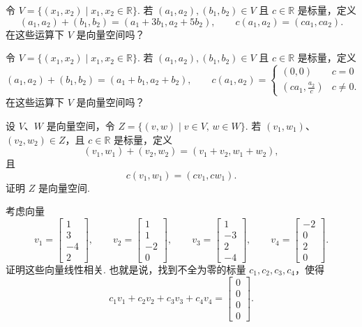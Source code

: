 \begin{question}\label{q:1-20}
令 $V=\{(x_1,x_2)\mid x_1,x_2\in\mathbb{R}\}$. 若 $(a_1,a_2),(b_1,b_2)\in V$ 且 $c\in\mathbb{R}$ 是标量，定义
\[
(a_1,a_2)+(b_1,b_2)=(a_1+3b_1,a_2+5b_2),\qquad c(a_1,a_2)=(ca_1,ca_2).
\]
在这些运算下 $V$ 是向量空间吗？
\end{question}

\begin{question}\label{q:1-21}
令 $V=\{(x_1,x_2)\mid x_1,x_2\in\mathbb{R}\}$. 若 $(a_1,a_2),(b_1,b_2)\in V$ 且 $c\in\mathbb{R}$ 是标量，定义
\[
(a_1,a_2)+(b_1,b_2)=(a_1+b_1,a_2+b_2),\qquad
c(a_1,a_2)=\begin{cases}(0,0)&c=0\\\left(ca_1,\frac{a_2}{c}\right)&c\neq0.\end{cases}
\]
在这些运算下 $V$ 是向量空间吗？
\end{question}

\begin{question}\label{q:1-22}
设 $V$、$W$ 是向量空间，令 $Z=\{(v,w)\mid v\in V,\,w\in W\}$. 若 $(v_1,w_1)$、$(v_2,w_2)\in Z$，且 $c\in\mathbb{R}$ 是标量，定义
\[
(v_1,w_1)+(v_2,w_2)=(v_1+v_2,w_1+w_2),
\]
且
\[
c(v_1,w_1)=(cv_1,cw_1).
\]
证明 $Z$ 是向量空间.
\end{question}

\begin{question}\label{q:1-23}
考虑向量
\[
v_1=\begin{bmatrix}1\\3\\-4\\2\end{bmatrix},\qquad
v_2=\begin{bmatrix}1\\1\\-2\\0\end{bmatrix},\qquad
v_3=\begin{bmatrix}1\\-3\\2\\-4\end{bmatrix},\qquad
v_4=\begin{bmatrix}-2\\0\\2\\0\end{bmatrix}.
\]
证明这些向量线性相关. 也就是说，找到不全为零的标量 $c_1,c_2,c_3,c_4$，使得
\[
c_1v_1+c_2v_2+c_3v_3+c_4v_4=\begin{bmatrix}0\\0\\0\\0\end{bmatrix}.
\]
\end{question}


